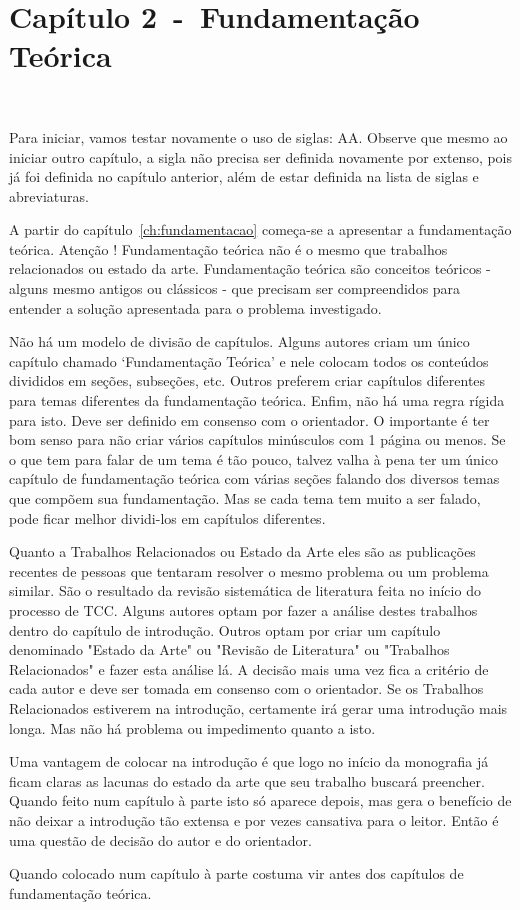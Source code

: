 
\setlength{\parskip}{0.3cm}

\chapter{Capítulo 2~-~Fundamentação Teórica}~\label{ch:fundamentacao}

Para iniciar, vamos testar novamente o uso de siglas: \gls{AA}. Observe que mesmo ao iniciar outro capítulo, a sigla não precisa ser definida novamente por extenso, pois já foi definida no capítulo anterior, além de estar definida na lista de siglas e abreviaturas.

A partir do capítulo~\ref{ch:fundamentacao} começa-se a apresentar a fundamentação teórica. Atenção ! Fundamentação teórica não é o mesmo que trabalhos relacionados ou estado da arte. Fundamentação teórica são conceitos teóricos - alguns mesmo antigos ou clássicos - que precisam ser compreendidos para entender a solução apresentada para o problema investigado.

Não há um modelo de divisão de capítulos. Alguns autores criam um único capítulo chamado `Fundamentação Teórica' e nele colocam todos os conteúdos divididos em seções, subseções, etc. Outros preferem criar capítulos diferentes para temas diferentes da fundamentação teórica. Enfim, não há uma regra rígida para isto. Deve ser definido em consenso com o orientador. O importante é ter bom senso para não criar vários capítulos minúsculos com 1 página ou menos. Se o que tem para falar de um tema é tão pouco, talvez valha à pena ter um único capítulo de fundamentação teórica com várias seções falando dos diversos temas que compõem sua fundamentação. Mas se cada tema tem muito a ser falado, pode ficar melhor dividi-los em capítulos diferentes.

Quanto a Trabalhos Relacionados ou Estado da Arte eles são as publicações recentes de pessoas que tentaram resolver o mesmo problema ou um problema similar. São o resultado da revisão sistemática de literatura feita no início do processo de TCC. Alguns autores optam por fazer a análise destes trabalhos dentro do capítulo de introdução. Outros optam por criar um capítulo denominado "Estado da Arte" ou "Revisão de Literatura" ou "Trabalhos Relacionados" e fazer esta análise lá. A decisão mais uma vez fica a critério de cada autor e deve ser tomada em consenso com o orientador. Se os Trabalhos Relacionados estiverem na introdução, certamente irá gerar uma introdução mais longa. Mas não há problema ou impedimento quanto a isto.

Uma vantagem de colocar na introdução é que logo no início da monografia já ficam claras as lacunas do estado da arte que seu trabalho buscará preencher. Quando feito num capítulo à parte isto só aparece depois, mas gera o benefício de não deixar a introdução tão extensa e por vezes cansativa para o leitor. Então é uma questão de decisão do autor e do orientador.

Quando colocado num capítulo à parte costuma vir antes dos capítulos de fundamentação teórica.
